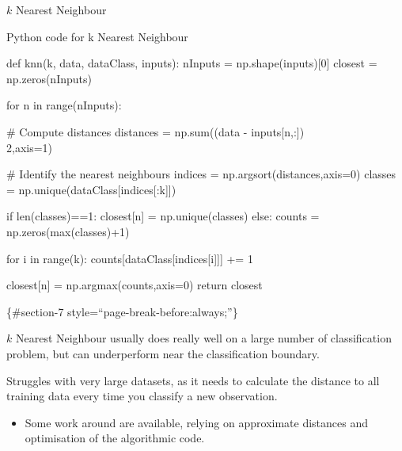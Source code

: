 \documentclass[compress]{beamer}
\providecommand{\tightlist}{%
  \setlength{\itemsep}{0pt}\setlength{\parskip}{0pt}}
\begin{document}
\begin{frame}[fragile]{\(k\) Nearest Neighbour}

\begin{block}{Python code for k Nearest Neighbour}

\begin{pythoncode}
def knn(k, data, dataClass, inputs):
  nInputs = np.shape(inputs)[0]
  closest = np.zeros(nInputs)

  for n in range(nInputs):
  
  # Compute distances
  distances = np.sum((data - inputs[n,:])\\2,axis=1)
  
  # Identify the nearest neighbours
  indices = np.argsort(distances,axis=0)
  classes = np.unique(dataClass[indices[:k]])
  
  if len(classes)==1:
    closest[n] = np.unique(classes)
  else:
    counts = np.zeros(max(classes)+1)
  
  for i in range(k):
    counts[dataClass[indices[i]]] += 1
  
  closest[n] = np.argmax(counts,axis=0)
  return closest
\end{pythoncode}

\{\#section-7 style=``page-break-before:always;''\}

\(k\) Nearest Neighbour usually does really well on a large number of
classification problem, but can underperform near the classification
boundary.

Struggles with very large datasets, as it needs to calculate the
distance to all training data every time you classify a new observation.

\begin{itemize}
\tightlist
\item
  Some work around are available, relying on approximate distances and
  optimisation of the algorithmic code.
\end{itemize}

\end{block}

\end{frame}
\end{document}
